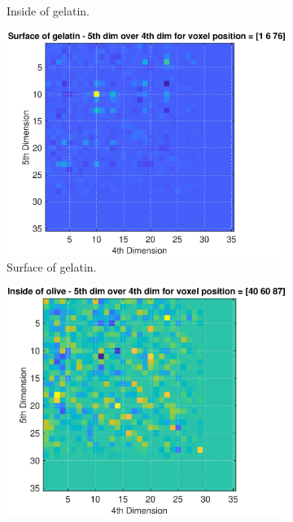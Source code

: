 \begin{figure}[H]
\begin{subfigure}[b]{0.47\textwidth}
         \caption{Inside of gelatin. }
         \label{fig:res:5D_4D_skin_pulp_compare_pulp}
     \end{subfigure}
          \hfill
     \begin{subfigure}[b]{0.47\textwidth}
         \centering
         \includegraphics[width=1.09\textwidth]{Graphics/Results/skin_pulp_stone_5D_4D_Skin.eps}
         \caption{Surface of gelatin. }
         \label{fig:res:5D_4D_skin_pulp_compare_skin}
     \end{subfigure}
               \hfill
     \begin{subfigure}[b]{0.47\textwidth}
         \centering
         \includegraphics[width=1.09\textwidth]{Graphics/Results/skin_pulp_stone_5D_4D_Inside_Olive.eps}

\end{subfigure}
\end{figure}
